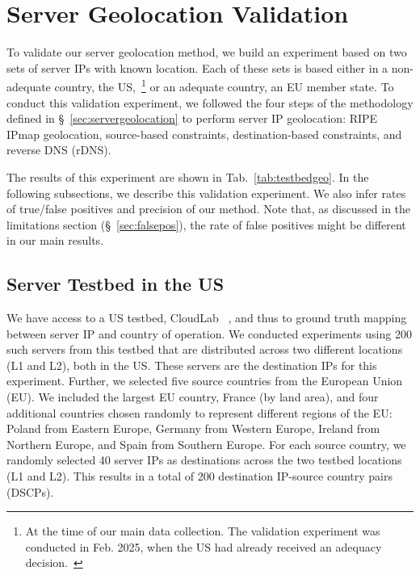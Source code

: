 \section{Server Geolocation Validation}
\label{sec:testbed}

To validate our server geolocation method, we build an experiment 
based on two sets of server IPs with known location.
Each of these sets is based either in a non-adequate country, the 
US,~\footnote{At the time of our main data collection. The validation experiment 
was conducted in Feb. 2025, when the US had already received an adequacy decision.~\cite{latham}}
or an adequate country, an EU member state.
To conduct this validation experiment, we followed the four steps 
of the methodology defined in \S~\ref{sec:servergeolocation} to perform 
server IP geolocation: RIPE IPmap geolocation, source-based constraints, 
destination-based constraints, and reverse DNS (rDNS).

The results of this experiment are shown in Tab.~\ref{tab:testbedgeo}.
In the following subsections, we describe this validation experiment.
We also infer rates of true/false positives and precision of our method.
Note that, as discussed in the limitations section (\S~\ref{sec:falsepos}), the 
rate of false positives might be different in our main results.




\subsection{Server Testbed in the US}
We have access 
to a US testbed, CloudLab ~\cite{CloudLab}, and thus to ground truth mapping between server IP and country of operation.
We conducted experiments using 200 such servers from this testbed that are
distributed across two different locations (L1 and L2), both in the US.
These servers are the destination IPs for this experiment. 
Further, we selected five source countries from 
the European Union (EU). We included the largest EU country, France (by land area), 
and four additional countries chosen randomly to represent different regions of the EU: 
Poland from Eastern Europe, Germany from Western Europe, Ireland from Northern Europe, 
and Spain from Southern Europe.
For each source country, we randomly selected 40 server IPs as destinations across 
the two testbed locations (L1 and L2). This results in a total of 200 destination IP-source
country pairs (DSCPs). 

